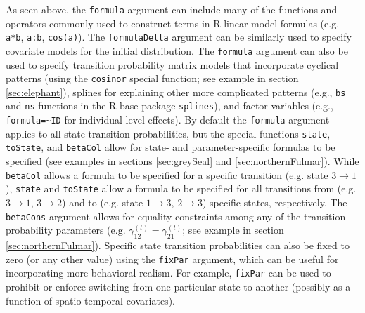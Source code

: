 \documentclass[12pt]{article}\usepackage[]{graphicx}\usepackage[]{xcolor}
\begin{document}
As seen above, the \verb|formula| argument can include many of the functions and operators commonly used to construct terms in R linear model formulas (e.g. \verb|a*b|, \verb|a:b|, \verb|cos(a)|). The \verb|formulaDelta| argument can be similarly used to specify covariate models for the initial distribution.  The \verb|formula| argument can also be used to specify transition probability matrix models that incorporate cyclical patterns (using the \verb|cosinor| special function; see example in section \ref{sec:elephant}), splines for explaining other more complicated patterns (e.g., \verb|bs| and \verb|ns| functions in the R base package \verb|splines|), and factor variables (e.g., \verb|formula=~ID| for individual-level effects).  By default the \verb|formula| argument applies to all state transition probabilities, but the special functions \verb|state|, \verb|toState|, and \verb|betaCol| allow for state- and parameter-specific formulas to be specified (see examples in sections \ref{sec:greySeal} and \ref{sec:northernFulmar}). While \verb|betaCol| allows a formula to be specified for a specific transition (e.g. state $3 \rightarrow 1$), \verb|state| and \verb|toState| allow a formula to be specified for all transitions from (e.g. $3 \rightarrow 1$, $3 \rightarrow 2$) and to (e.g. state $1 \rightarrow 3$, $2 \rightarrow 3$) specific states, respectively. The \verb|betaCons| argument allows for equality constraints among any of the transition probability parameters (e.g. $\gamma^{(t)}_{12}=\gamma^{(t)}_{21}$; see example in section \ref{sec:northernFulmar}). Specific state transition probabilities can also be fixed to zero (or any other value) using the \verb|fixPar| argument, which can be useful for incorporating more behavioral realism.  For example, \verb|fixPar| can be used to prohibit or enforce switching from one particular state to another (possibly as a function of spatio-temporal covariates). 
\end{document}
